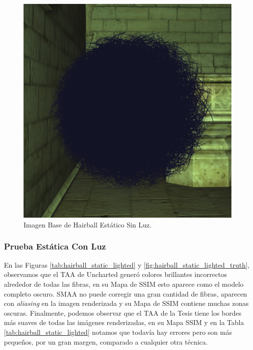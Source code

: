 \documentclass[pregrado]{tesis-usb} %
\begin{document}
\begin{figure}[!htb]
	\centering
	\includegraphics[scale=0.3]{images/results/hairball_sobel_ground_truth.png}
	\caption{Imagen Base de Hairball Estático Sin Luz.}\label{fig:hairball_static_shadow_truth}
\end{figure}

\FloatBarrier

\subsubsection{Prueba Estática Con Luz}
En las Figuras \ref{tab:hairball_static_lighted} y \ref{fig:hairball_static_lighted_truth}, observamos que el TAA de Uncharted generó colores brillantes incorrectos alrededor de todas las fibras, en su Mapa de SSIM esto aparece como el modelo completo oscuro. SMAA no puede corregir una gran cantidad de fibras, aparecen con \textit{aliasing} en la imagen renderizada y su Mapa de SSIM contiene muchas zonas oscuras. Finalmente, podemos observar que el TAA de la Tesis tiene los bordes más suaves de todas las imágenes renderizadas, en su Mapa SSIM y en la Tabla \ref{tab:hairball_static_lighted} notamos que todavía hay errores pero son más pequeños, por un gran margen, comparado a cualquier otra técnica.
\end{document}
